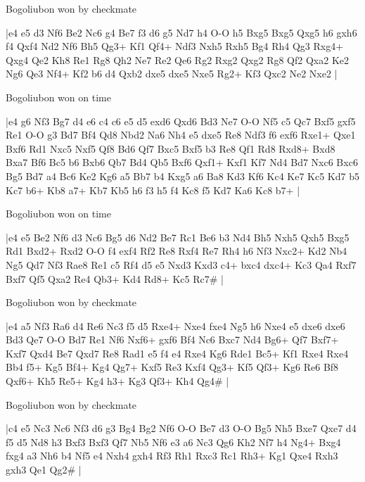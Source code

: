 \showboard

Bogoliubon won by checkmate

\makegametitle
|e4 e5 d3 Nf6 Be2 Nc6 g4 Be7 f3 d6 g5 Nd7 h4 O-O h5 Bxg5 Bxg5 Qxg5 h6 gxh6 f4 Qxf4 Nd2 Nf6 Bh5 Qg3+ Kf1 Qf4+ Ndf3 Nxh5 Rxh5 Bg4 Rh4 Qg3 Rxg4+ Qxg4 Qe2 Kh8 Re1 Rg8 Qh2 Ne7 Re2 Qe6 Rg2 Rxg2 Qxg2 Rg8 Qf2 Qxa2 Ke2 Ng6 Qe3 Nf4+ Kf2 b6 d4 Qxb2 dxe5 dxe5 Nxe5 Rg2+ Kf3 Qxc2 Ne2 Nxe2  |

\showboard

Bogoliubon won on time

\makegametitle
|e4 g6 Nf3 Bg7 d4 e6 c4 c6 e5 d5 exd6 Qxd6 Bd3 Ne7 O-O Nf5 c5 Qc7 Bxf5 gxf5 Re1 O-O g3 Bd7 Bf4 Qd8 Nbd2 Na6 Nh4 e5 dxe5 Re8 Ndf3 f6 exf6 Rxe1+ Qxe1 Bxf6 Rd1 Nxc5 Nxf5 Qf8 Bd6 Qf7 Bxc5 Bxf5 b3 Re8 Qf1 Rd8 Rxd8+ Bxd8 Bxa7 Bf6 Bc5 b6 Bxb6 Qb7 Bd4 Qb5 Bxf6 Qxf1+ Kxf1 Kf7 Nd4 Bd7 Nxc6 Bxc6 Bg5 Bd7 a4 Bc6 Ke2 Kg6 a5 Bb7 b4 Kxg5 a6 Ba8 Kd3 Kf6 Kc4 Ke7 Kc5 Kd7 b5 Kc7 b6+ Kb8 a7+ Kb7 Kb5 h6 f3 h5 f4 Kc8 f5 Kd7 Ka6 Kc8 b7+  |

\showboard

Bogoliubon won on time

\makegametitle
|e4 e5 Be2 Nf6 d3 Nc6 Bg5 d6 Nd2 Be7 Rc1 Be6 b3 Nd4 Bh5 Nxh5 Qxh5 Bxg5 Rd1 Bxd2+ Rxd2 O-O f4 exf4 Rf2 Re8 Rxf4 Re7 Rh4 h6 Nf3 Nxc2+ Kd2 Nb4 Ng5 Qd7 Nf3 Rae8 Re1 c5 Rf4 d5 e5 Nxd3 Kxd3 c4+ bxc4 dxc4+ Kc3 Qa4 Rxf7 Bxf7 Qf5 Qxa2 Re4 Qb3+ Kd4 Rd8+ Kc5 Rc7\#  |

\showboard

Bogoliubon won by checkmate

\makegametitle
|e4 a5 Nf3 Ra6 d4 Re6 Nc3 f5 d5 Rxe4+ Nxe4 fxe4 Ng5 h6 Nxe4 e5 dxe6 dxe6 Bd3 Qe7 O-O Bd7 Re1 Nf6 Nxf6+ gxf6 Bf4 Nc6 Bxc7 Nd4 Bg6+ Qf7 Bxf7+ Kxf7 Qxd4 Be7 Qxd7 Re8 Rad1 e5 f4 e4 Rxe4 Kg6 Rde1 Bc5+ Kf1 Rxe4 Rxe4 Bb4 f5+ Kg5 Bf4+ Kg4 Qg7+ Kxf5 Re3 Kxf4 Qg3+ Kf5 Qf3+ Kg6 Re6 Bf8 Qxf6+ Kh5 Re5+ Kg4 h3+ Kg3 Qf3+ Kh4 Qg4\#  |

\showboard

Bogoliubon won by checkmate

\makegametitle
|c4 e5 Nc3 Nc6 Nf3 d6 g3 Bg4 Bg2 Nf6 O-O Be7 d3 O-O Bg5 Nh5 Bxe7 Qxe7 d4 f5 d5 Nd8 h3 Bxf3 Bxf3 Qf7 Nb5 Nf6 e3 a6 Nc3 Qg6 Kh2 Nf7 h4 Ng4+ Bxg4 fxg4 a3 Nh6 b4 Nf5 e4 Nxh4 gxh4 Rf3 Rh1 Rxc3 Rc1 Rh3+ Kg1 Qxe4 Rxh3 gxh3 Qe1 Qg2\#  |

